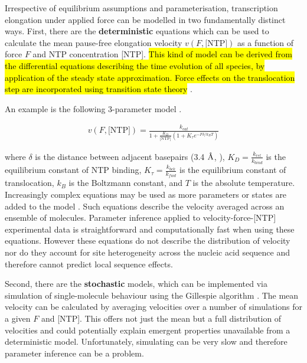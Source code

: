 \documentclass[10pt,letterpaper]{article}
\newcommand{\angstrom}{\mbox{\normalfont\AA}}
\begin{document}
Irrespective of equilibrium assumptions and parameterisation, transcription elongation under applied force can be modelled in two fundamentally distinct ways. First, there are the \textbf{deterministic}  equations which can be used to calculate the mean pause-free elongation velocity $v(F, \text{[NTP]})$ as a function of force $F$ and NTP concentration [NTP]. \hl{ This kind of model can be derived from  the differential equations describing the time evolution of all species, by application of the steady state approximation. Force effects on the translocation step are incorporated using transition state theory} \cite{bustamante2004mechanical,cleland1975partition}.

An example is the following 3-parameter model \cite{abbondanzieri2005direct}.


\begin{eqnarray}
\label{eq:deterministicBoltzmann}
v(F, \text{[NTP]}) = \frac{k_{cat}}{1 + \frac{K_D}{\text{[NTP]}}(1 + K_\tau  e^{-F \delta / k_B T})}
\end{eqnarray}



where $\delta$ is the distance between adjacent basepairs (3.4 $\angstrom$, \cite{watson1953molecular}), $K_D = \frac{k_{rel}}{k_{bind}}$ is the equilibrium constant of NTP binding, $K_\tau = \frac{k_{bck}}{k_{fwd}}$ is the equilibrium constant of translocation, $k_B$ is the Boltzmann constant, and $T$ is the absolute temperature. Increasingly complex equations may be used as more parameters or states are added to the model \cite{abbondanzieri2005direct, maoileidigh2011unified, bai2007mechanochemical}. Such equations describe the velocity averaged across an ensemble of molecules. Parameter inference applied to velocity-force-[NTP] experimental data is straightforward and computationally fast when using these equations. However these equations do not describe the distribution of velocity nor do they account for site heterogeneity across the nucleic acid sequence and therefore cannot predict local sequence effects. \par


Second, there are the \textbf{stochastic} models, which can be implemented via simulation of single-molecule behaviour using the Gillespie algorithm \cite{gillespie1977exact}. The mean velocity can be calculated by averaging velocities over a number of simulations for a given $F$ and [NTP]. This offers not just the mean but a full distribution of velocities and could potentially explain emergent properties unavailable from a deterministic model. Unfortunately, simulating can be very slow and therefore parameter inference can be a problem. \\
\end{document}
